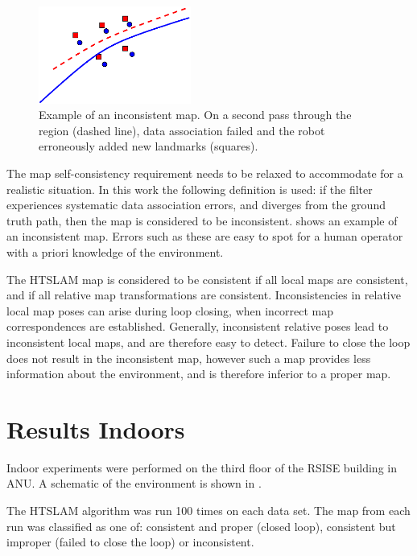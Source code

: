 \begin{figure}[htbp]
  \centering
  \includegraphics[width=5cm]{Pics/fig_inconsistent_map}
  \caption[Example of an inconsistent map]
  {Example of an inconsistent map. On a second pass through
    the region (dashed line), data association failed and the robot
    erroneously added new landmarks (squares).}
  \label{fig:inconsistent_map}
\end{figure}


The map self-consistency requirement needs to be relaxed to
accommodate for a realistic situation. In this work the following
definition is used: if the filter experiences systematic data
association errors, and diverges from the ground truth path, then the
map is considered to be inconsistent. 
shows an example of an inconsistent map. Errors such as these are easy
to spot for a human operator with a priori knowledge of the
environment.

The HTSLAM map is considered to be consistent if all local maps are
consistent, and if all relative map transformations are consistent.
Inconsistencies in relative local map poses can arise during loop
closing, when incorrect map correspondences are established.
Generally, inconsistent relative poses lead to inconsistent local
maps, and are therefore easy to detect. Failure to close the loop does
not result in the inconsistent map, however such a map provides less
information about the environment, and is therefore inferior to a
proper map.

\section {Results Indoors}

Indoor experiments were performed on the third floor of the RSISE
building in ANU. A schematic of the environment is shown in
.

The HTSLAM algorithm was run 100 times on each data set. The map from
each run was classified as one of: consistent and proper (closed
loop), consistent but improper (failed to close the loop) or
inconsistent.

